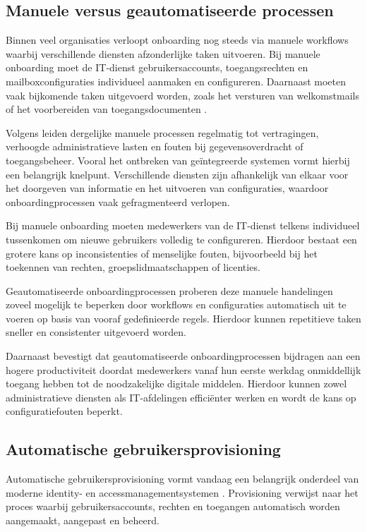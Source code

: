 \subsection{Manuele versus geautomatiseerde processen}

Binnen veel organisaties verloopt onboarding nog steeds via manuele workflows waarbij verschillende diensten afzonderlijke taken uitvoeren. Bij manuele onboarding moet de IT-dienst gebruikersaccounts, toegangsrechten en mailboxconfiguraties individueel aanmaken en configureren. Daarnaast moeten vaak bijkomende taken uitgevoerd worden, zoals het versturen van welkomstmails of het voorbereiden van toegangsdocumenten \autocite{Ramesh2026}.

Volgens \textcite{Radev2023} leiden dergelijke manuele processen regelmatig tot vertragingen, verhoogde administratieve lasten en fouten bij gegevensoverdracht of toegangsbeheer. Vooral het ontbreken van geïntegreerde systemen vormt hierbij een belangrijk knelpunt. Verschillende diensten zijn afhankelijk van elkaar voor het doorgeven van informatie en het uitvoeren van configuraties, waardoor onboardingprocessen vaak gefragmenteerd verlopen.

Bij manuele onboarding moeten medewerkers van de IT-dienst telkens individueel tussenkomen om nieuwe gebruikers volledig te configureren. Hierdoor bestaat een grotere kans op inconsistenties of menselijke fouten, bijvoorbeeld bij het toekennen van rechten, groepslidmaatschappen of licenties.

Geautomatiseerde onboardingprocessen proberen deze manuele handelingen zoveel mogelijk te beperken door workflows en configuraties automatisch uit te voeren op basis van vooraf gedefinieerde regels. Hierdoor kunnen repetitieve taken sneller en consistenter uitgevoerd worden.

Daarnaast bevestigt \textcite{Vitla2023} dat geautomatiseerde onboardingprocessen bijdragen aan een hogere productiviteit doordat medewerkers vanaf hun eerste werkdag onmiddellijk toegang hebben tot de noodzakelijke digitale middelen. Hierdoor kunnen zowel administratieve diensten als IT-afdelingen efficiënter werken en wordt de kans op configuratiefouten beperkt.

\subsection{Automatische gebruikersprovisioning}

Automatische gebruikersprovisioning vormt vandaag een belangrijk onderdeel van moderne identity- en accessmanagementsystemen \autocite{openIAM}. Provisioning verwijst naar het proces waarbij gebruikersaccounts, rechten en toegangen automatisch worden aangemaakt, aangepast en beheerd.

